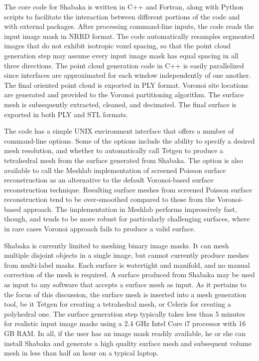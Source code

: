 The core code for Shabaka is written in C++ and Fortran, along with Python scripts to facilitate the interaction between different portions of the code and with external packages. After processing command-line inputs, the code reads the input image mask in NRRD format. The code automatically resamples segmented images that do not exhibit isotropic voxel spacing, so that the point cloud generation step may assume every input image mask has equal spacing in all three directions. The point cloud generation code in C++ is easily parallelized since interfaces are approximated for each window independently of one another. The final oriented point cloud is exported in PLY format. Voronoi site locations are generated and provided to the Voronoi partitioning algorithm. The surface mesh is subsequently extracted, cleaned, and decimated. The final surface is exported in both PLY and STL formats.

The code has a simple UNIX environment interface that offers a number of command-line options. Some of the options include the ability to specify a desired mesh resolution, and whether to automatically call Tetgen to produce a tetrahedral mesh from the surface generated from Shabaka. The option is also available to call the Meshlab implementation of screened Poisson surface reconstruction as an alternative to the default Voronoi-based surface reconstruction technique. Resulting surface meshes from screened Poisson surface reconstruction tend to be over-smoothed compared to those from the Voronoi-based approach. The implementation in Meshlab performs impressively fast, though, and tends to be more robust for particularly challenging surfaces, where in rare cases Voronoi approach fails to produce a valid surface.

Shabaka is currently limited to meshing binary image masks. It can mesh multiple disjoint objects in a single image, but cannot currently produce meshes from multi-label masks. Each surface is watertight and manifold, and no manual correction of the mesh is required. A surface produced from Shabaka may be used as input to any software that accepts a surface mesh as input. As it pertains to the focus of this discussion, the surface mesh is inserted into a mesh generation tool, be it Tetgen for creating a tetrahedral mesh, or Celeris for creating a polyhedral one. The surface generation step typically takes less than 5 minutes for realistic input image masks using a 2.4 GHz Intel Core i7 processor with 16 GB RAM. In all, if the user has an image mask readily available, he or she can install Shabaka and generate a high quality surface mesh and subsequent volume mesh in less than half an hour on a typical laptop.

